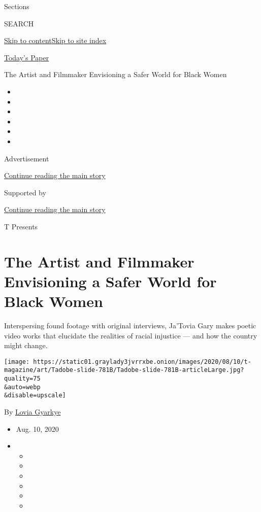 Sections

SEARCH

\protect\hyperlink{site-content}{Skip to
content}\protect\hyperlink{site-index}{Skip to site index}

\href{https://myaccount.nytimes3xbfgragh.onion/auth/login?response_type=cookie\&client_id=vi}{}

\href{https://www.nytimes3xbfgragh.onion/section/todayspaper}{Today's
Paper}

The Artist and Filmmaker Envisioning a Safer World for Black Women

\begin{itemize}
\item
\item
\item
\item
\item
\item
\end{itemize}

Advertisement

\protect\hyperlink{after-top}{Continue reading the main story}

Supported by

\protect\hyperlink{after-sponsor}{Continue reading the main story}

T Presents

\hypertarget{the-artist-and-filmmaker-envisioning-a-safer-world-for-black-women}{%
\section{The Artist and Filmmaker Envisioning a Safer World for Black
Women}\label{the-artist-and-filmmaker-envisioning-a-safer-world-for-black-women}}

Interspersing found footage with original interviews, Ja'Tovia Gary
makes poetic video works that elucidate the realities of racial
injustice --- and how the country might change.

\texttt{[image: https://static01.graylady3jvrrxbe.onion/images/2020/08/10/t-magazine/art/Tadobe-slide-781B/Tadobe-slide-781B-articleLarge.jpg?quality=75\\\&auto=webp\\\&disable=upscale]}

By \href{https://www.nytimes3xbfgragh.onion/by/lovia-gyarkye}{Lovia
Gyarkye}

\begin{itemize}
\item
  Aug. 10, 2020
\item
  \begin{itemize}
  \item
  \item
  \item
  \item
  \item
  \item
  \end{itemize}
\end{itemize}

